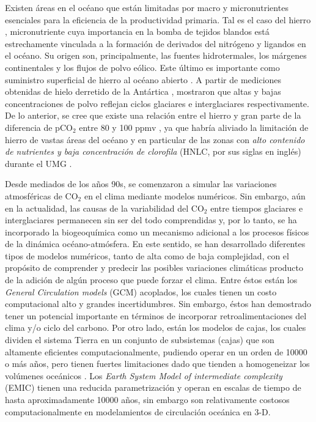 Existen áreas en el océano que están limitadas por macro y micronutrientes esenciales para la eficiencia de la productividad primaria. Tal es el caso del hierro \citep{archer2000caused,jickells2005global,martinez2014iron}, micronutriente cuya importancia en la bomba de tejidos blandos est\'a estrechamente vinculada a la formaci\'on de derivados del nitr\'ogeno y ligandos en el oc\'eano. Su origen son, principalmente, las fuentes hidrotermales, los m\'argenes continentales y los flujos de polvo eólico. Este \'ultimo es importante como suministro superficial de hierro al oc\'eano abierto \citep{mahowald2011aerosol,prospero2002environmental,tagliabue2017integral}. A partir de mediciones obtenidas de hielo derretido de la Ant\'artica \citep{augustin2004eight}, \cite{lambert2008dust} mostraron que altas y bajas concentraciones de polvo reflejan ciclos glaciares e interglaciares respectivamente. De lo anterior, se cree que existe una relaci\'on entre el hierro y gran parte de la diferencia de pCO$_2$ entre 80 y 100 ppmv \citep{shaffer2018and}, ya que habría aliviado la limitación de hierro de vastas \'areas del océano y en particular de las zonas con \textit{alto contenido de nutrientes y baja concentración de clorofila} (HNLC, por sus siglas en inglés) durante el UMG \citep{martin1990glacial}.

Desde mediados de los años 90s, se comenzaron a simular las variaciones atmosféricas de CO$_2$ en el clima mediante modelos numéricos. Sin embargo, aún en la actualidad, las causas de la variabilidad del CO$_2$ entre tiempos glaciares e interglaciares permanecen sin ser del todo comprendidas y, por lo tanto, se ha incorporado la biogeoquímica como un mecanismo adicional a los procesos f\'isicos de la din\'amica oc\'eano-atm\'osfera. En este sentido, se han desarrollado diferentes tipos de modelos num\'ericos, tanto de alta como de baja complejidad, con el prop\'osito de comprender y predecir las posibles variaciones clim\'aticas producto de la adici\'on de alg\'un proceso que puede forzar el clima. Entre \'estos est\'an los \textit{General Circulation models} (GCM) acoplados, los cuales tienen un costo computacional alto y grandes incertidumbres. Sin embargo, éstos han demostrado tener un potencial importante en t\'erminos de incorporar retroalimentaciones del clima y/o ciclo del carbono. Por otro lado, están los modelos de cajas, los cuales dividen el sistema Tierra en un conjunto de subsistemas (cajas) que son altamente eficientes computacionalmente, pudiendo operar en un orden de 10000 o más años, pero tienen fuertes limitaciones dado que tienden a homogeneizar los volúmenes oceánicos \citep{weber2010utility}. Los \textit{Earth System Model of intermediate complexity} (EMIC) tienen una reducida parametrización y operan en escalas de tiempo de hasta aproximadamente 10000 años, sin embargo son relativamente costosos computacionalmente en modelamientos de circulación oceánica en 3-D.  

